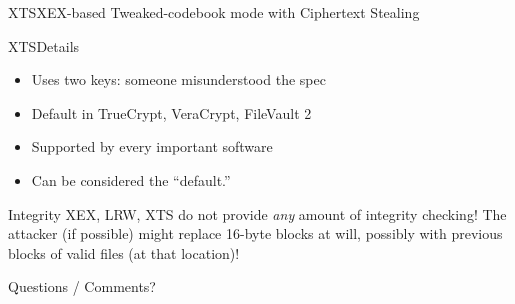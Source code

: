 \documentclass[12pt]{beamer}
\begin{document}
\begin{frame}{XTS}{XEX-based Tweaked-codebook mode with Ciphertext Stealing}
	\centering
\end{frame}

\begin{frame}{XTS}{Details}
	\begin{itemize}
		\item Uses two keys: someone misunderstood the spec \\
		\item Default in TrueCrypt, VeraCrypt, FileVault 2 \\
		\item Supported by every important software \\
		\item Can be considered the ``default.''
	\end{itemize}
	\begin{alertblock}{Integrity}
		XEX, LRW, XTS do not provide \textit{any} amount of integrity checking!
		The attacker (if possible) might replace 16-byte blocks at will,
		possibly with previous blocks of valid files (at that location)!
	\end{alertblock}
\end{frame}

\begin{frame}{Questions / Comments?}{}
\end{frame}
\end{document}
